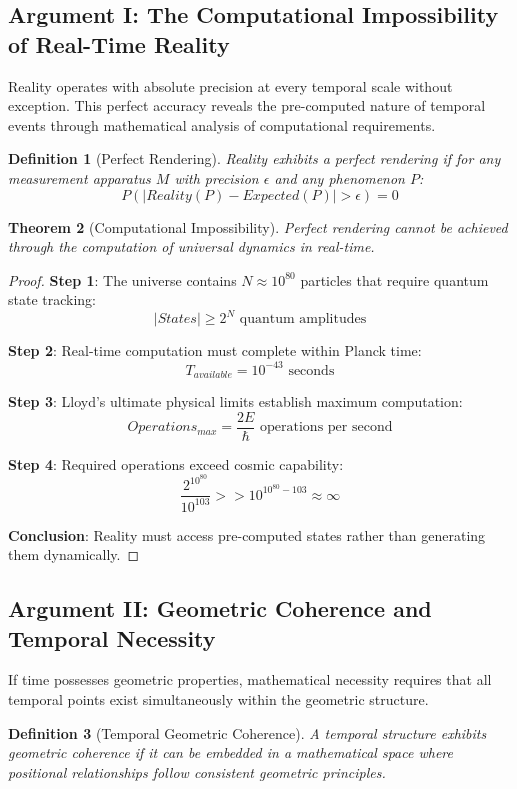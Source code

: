 \documentclass[11pt]{article}
\newtheorem{theorem}{Theorem}[section]
\newtheorem{definition}[theorem]{Definition}
\theoremstyle{remark}
\begin{document}
\subsection{Argument I: The Computational Impossibility of Real-Time Reality}

Reality operates with absolute precision at every temporal scale without exception. This perfect accuracy reveals the pre-computed nature of temporal events through mathematical analysis of computational requirements.

\begin{definition}[Perfect Rendering]
Reality exhibits a perfect rendering if for any measurement apparatus $M$ with precision $\epsilon$ and any phenomenon $P$:
$$P(|Reality(P) - Expected(P)| > \epsilon) = 0$$
\end{definition}

\begin{theorem}[Computational Impossibility]
Perfect rendering cannot be achieved through the computation of universal dynamics in real-time.
\end{theorem}

\begin{proof}
\textbf{Step 1}: The universe contains $N \approx 10^{80}$ particles that require quantum state tracking:
$$|States| \geq 2^{N} \text{ quantum amplitudes}$$

\textbf{Step 2}: Real-time computation must complete within Planck time:
$$T_{available} = 10^{-43} \text{ seconds}$$

\textbf{Step 3}: Lloyd's ultimate physical limits establish maximum computation:
$$Operations_{max} = \frac{2E}{\hbar} \text{ operations per second}$$

\textbf{Step 4}: Required operations exceed cosmic capability:
$$\frac{2^{10^{80}}}{10^{103}} >> 10^{10^{80}-103} \approx \infty$$

\textbf{Conclusion}: Reality must access pre-computed states rather than generating them dynamically.
\end{proof}

\subsection{Argument II: Geometric Coherence and Temporal Necessity}

If time possesses geometric properties, mathematical necessity requires that all temporal points exist simultaneously within the geometric structure.

\begin{definition}[Temporal Geometric Coherence]
A temporal structure exhibits geometric coherence if it can be embedded in a mathematical space where positional relationships follow consistent geometric principles.
\end{definition}
\end{document}
